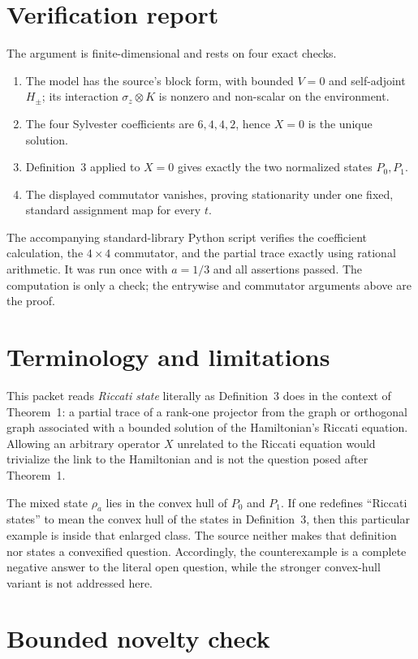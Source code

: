 \documentclass[11pt]{article}
\begin{document}
\section{Verification report}

The argument is finite-dimensional and rests on four exact checks.
\begin{enumerate}
\item The model has the source's block form, with bounded $V=0$ and
self-adjoint $H_\pm$; its interaction $\sigma_z\otimes K$ is nonzero and
non-scalar on the environment.
\item The four Sylvester coefficients are $6,4,4,2$, hence $X=0$ is the
unique solution.
\item Definition~3 applied to $X=0$ gives exactly the two normalized states
$P_0,P_1$.
\item The displayed commutator vanishes, proving stationarity under one fixed,
standard assignment map for every $t$.
\end{enumerate}
The accompanying standard-library Python script verifies the coefficient
calculation, the $4\times4$ commutator, and the partial trace exactly using
rational arithmetic. It was run once with $a=1/3$ and all assertions passed.
The computation is only a check; the entrywise and commutator arguments above
are the proof.

\section{Terminology and limitations}

This packet reads \emph{Riccati state} literally as Definition~3 does in the
context of Theorem~1: a partial trace of a rank-one projector from the graph or
orthogonal graph associated with a bounded solution of the Hamiltonian's
Riccati equation. Allowing an arbitrary operator $X$ unrelated to the
Riccati equation would trivialize the link to the Hamiltonian and is not the
question posed after Theorem~1.

The mixed state $\rho_a$ lies in the convex hull of $P_0$ and $P_1$. If one
redefines ``Riccati states'' to mean the convex hull of the states in
Definition~3, then this particular example is inside that enlarged class.
The source neither makes that definition nor states a convexified question.
Accordingly, the counterexample is a complete negative answer to the literal
open question, while the stronger convex-hull variant is not addressed here.

\section{Bounded novelty check}
\end{document}
